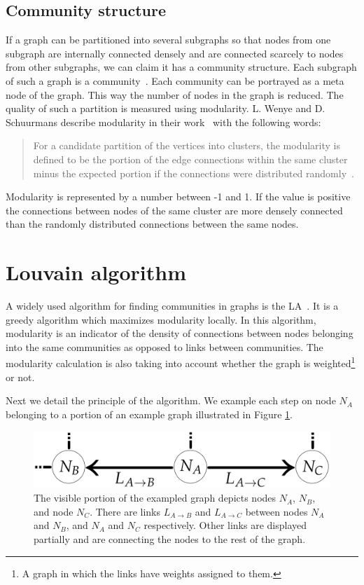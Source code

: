 \subsection{Community structure} \label{communityStructure}
If a graph can be partitioned into several subgraphs so that nodes from one subgraph are internally connected densely and are connected scarcely to nodes from other subgraphs, we can claim it has a community structure. Each subgraph of such a graph is a community~\cite{communitiesOverview}. Each community can be portrayed as a meta node of the graph. This way the number of nodes in the graph is reduced. The quality of such a partition is measured using modularity. L. Wenye and D. Schuurmans describe modularity in their work~\cite{modularityOverview} with the following words: \begin{quotation}  For a candidate partition of the vertices into clusters, the modularity is defined to be the portion of the edge connections within the same cluster minus the expected portion if the connections were distributed randomly~\cite{modularityDefinition}. \end{quotation} Modularity is represented by a number between -1 and 1. If the value is positive the connections between nodes of the same cluster are more densely connected than the randomly distributed connections between the same nodes.

\section{Louvain algorithm} \label{louvainAlgorithm}
A widely used algorithm for finding communities in graphs is the LA~\cite{louvainAlgorithm}. It is a greedy algorithm which maximizes modularity locally. In this algorithm, modularity is an indicator of the density of connections between nodes belonging into the same communities as opposed to links between communities. The modularity calculation is also taking into account whether the graph is weighted\footnote{A graph in which the links have weights assigned to them.} or not.

Next we detail the principle of the algorithm. We example each step on node $N_{A}$ belonging to a portion of an example graph illustrated in Figure \ref{exampleGraphLouvain}.
\begin{figure}[ht!]
  \centering
  \includegraphics[width=\textwidth]{Images/graphForCommunity.png}
  \caption{The visible portion of the exampled graph depicts nodes $N_{A}$, $N_{B}$, and  node $N_{C}$. There are links  $L_{A\rightarrow B}$ and  $L_{A\rightarrow C}$  between nodes  $N_{A}$ and  $N_{B}$, and  $N_{A}$ and  $N_{C}$ respectively. Other links are displayed partially and are connecting the nodes to the rest of the graph.}
  \label{exampleGraphLouvain}
\end{figure} 

